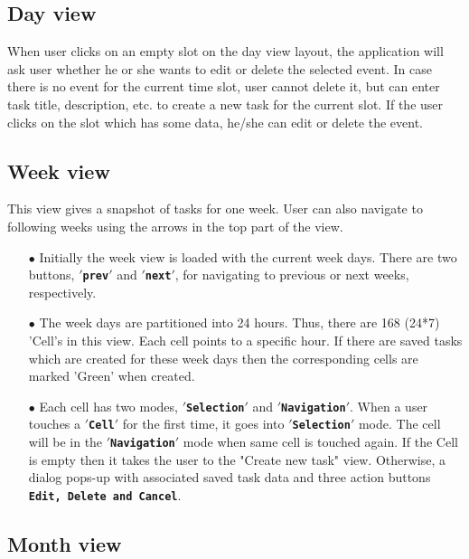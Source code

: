 \documentclass[10pt,a4paper]{report}
\begin{document}
\subsection{Day view}
When user clicks on an empty slot on the day view layout, the application will ask user whether he or she wants to edit or delete the selected event. In case there is no event for the current time slot, user cannot delete it, but can enter task title, description, etc. to create a new task for the current slot. If the user clicks on the slot which has some data, he/she can edit or delete the event.

\subsection{Week view}

This view gives a snapshot of tasks for one week. User can also navigate to following weeks using the arrows in the top part of the view.

\begin{itemize}

 \item[$\bullet$] Initially the week view is loaded with the current week days. There are two buttons, \textbf{\texttt{$'$prev$'$}} and \textbf{\texttt{$'$next$'$}}, for navigating to previous or next weeks, respectively.
 \item[$\bullet$] The week days are partitioned into 24 hours. Thus, there are 168 (24*7) 'Cell's in this view. Each cell points to a specific hour. If there are saved tasks which are created for these week days then the corresponding cells are marked 'Green' when created.
 \item[$\bullet$] Each cell has two modes, \textbf{\texttt{$'$Selection$'$}} and \textbf{\texttt{$'$Navigation$'$}}. When a user touches a \textbf{\texttt{$'$Cell$'$}} for the first time, it goes into \textbf{\texttt{$'$Selection$'$}} mode. The cell will be in the \textbf{\texttt{$'$Navigation$'$}} mode when same cell is touched again. If the Cell is empty then it takes the user to the "Create new task" view. Otherwise, a dialog pops-up with associated saved task data and three action buttons \textbf{\texttt{Edit, Delete and Cancel}}.
  
\end{itemize}
 

\subsection{Month view}
\end{document}
